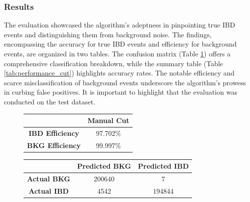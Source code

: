 \vspace{-1cm}

\subsubsection{Results}
The evaluation showcased the algorithm's adeptness in pinpointing true IBD events and distinguishing them from background noise. The findings, encompassing the accuracy for true IBD events and efficiency for background events, are organized in two tables. The confusion matrix (Table \ref{tab:confusion_matrix_cut}) offers a comprehensive classification breakdown, while the summary table (Table \ref{tab:performance_cut}) highlights accuracy rates. The notable efficiency and scarce misclassification of background events underscore the algorithm's prowess in curbing false positives. It is important to highlight that the evaluation was conducted on the test dataset.


\vspace{-0.2 cm}
\begin{figure}[h!]
	\centering
	\small
	\hspace{-4cm}
	\begin{minipage}{0.3\textwidth}
		\begin{tabular}{cc}
			\toprule
			 & \textbf{Manual Cut} \\ 
			\midrule
			\textbf{IBD Efficiency} &  97.702\% \\ 
			\textbf{BKG Efficiency} &  99.997\% \\ 
			\bottomrule
		\end{tabular}
		\label{tab:performance_cut}
	\end{minipage}
\hspace{1.5cm}
	\begin{minipage}{0.5\textwidth}
		\centering
		\begin{tabular}{ccc}
			\toprule
			& \textbf{Predicted BKG} & \textbf{Predicted IBD} \\
			\midrule
			\textbf{Actual BKG} & 200640 & 7 \\
			\textbf{Actual IBD} & 4542 & 194844 \\
			\bottomrule
		\end{tabular}
	\label{tab:confusion_matrix_cut}
	\end{minipage}
	\hspace{-2cm}
\end{figure}

